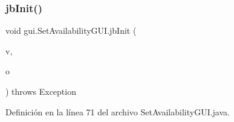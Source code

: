 \subsubsection{\texorpdfstring{jbInit()}{jbInit()}}
{\footnotesize\ttfamily void gui.\+Set\+Availability\+G\+U\+I.\+jb\+Init (\begin{DoxyParamCaption}\item[{Array\+List$<$ \mbox{\hyperlink{classdomain_1_1_rural_house}{Rural\+House}} $>$}]{v,  }\item[{\mbox{\hyperlink{classdomain_1_1_owner}{Owner}}}]{o }\end{DoxyParamCaption}) throws Exception\hspace{0.3cm}{\ttfamily [private]}}



Definición en la línea 71 del archivo Set\+Availability\+G\+U\+I.\+java.


